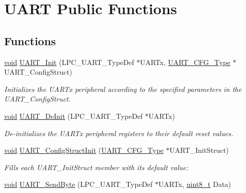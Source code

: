 \hypertarget{group___u_a_r_t___public___functions}{}\section{U\+A\+RT Public Functions}
\label{group___u_a_r_t___public___functions}
\subsection*{Functions}
\begin{DoxyCompactItemize}
\item 
\hyperlink{usb__devapi_8h_afabf60e7f57651d6d595a02c75f07cd0}{void} \hyperlink{group___u_a_r_t___public___functions_ga38648a309b0eb01e488f593f93fd9e02}{U\+A\+R\+T\+\_\+\+Init} (L\+P\+C\+\_\+\+U\+A\+R\+T\+\_\+\+Type\+Def $\ast$U\+A\+R\+Tx, \hyperlink{struct_u_a_r_t___c_f_g___type}{U\+A\+R\+T\+\_\+\+C\+F\+G\+\_\+\+Type} $\ast$U\+A\+R\+T\+\_\+\+Config\+Struct)
\begin{DoxyCompactList}\small\item\em Initializes the U\+A\+R\+Tx peripheral according to the specified parameters in the U\+A\+R\+T\+\_\+\+Config\+Struct. \end{DoxyCompactList}\item 
\hyperlink{usb__devapi_8h_afabf60e7f57651d6d595a02c75f07cd0}{void} \hyperlink{group___u_a_r_t___public___functions_ga3074f639a2a3de38e5d0129c8ba113b4}{U\+A\+R\+T\+\_\+\+De\+Init} (L\+P\+C\+\_\+\+U\+A\+R\+T\+\_\+\+Type\+Def $\ast$U\+A\+R\+Tx)
\begin{DoxyCompactList}\small\item\em De-\/initializes the U\+A\+R\+Tx peripheral registers to their default reset values. \end{DoxyCompactList}\item 
\hyperlink{usb__devapi_8h_afabf60e7f57651d6d595a02c75f07cd0}{void} \hyperlink{group___u_a_r_t___public___functions_gab27415db995bfdbcd9984073833053d9}{U\+A\+R\+T\+\_\+\+Config\+Struct\+Init} (\hyperlink{struct_u_a_r_t___c_f_g___type}{U\+A\+R\+T\+\_\+\+C\+F\+G\+\_\+\+Type} $\ast$U\+A\+R\+T\+\_\+\+Init\+Struct)
\begin{DoxyCompactList}\small\item\em Fills each U\+A\+R\+T\+\_\+\+Init\+Struct member with its default value\+: \end{DoxyCompactList}\item 
\hyperlink{usb__devapi_8h_afabf60e7f57651d6d595a02c75f07cd0}{void} \hyperlink{group___u_a_r_t___public___functions_gaed06c5f6548091cba78b88700b82ad62}{U\+A\+R\+T\+\_\+\+Send\+Byte} (L\+P\+C\+\_\+\+U\+A\+R\+T\+\_\+\+Type\+Def $\ast$U\+A\+R\+Tx, \hyperlink{_p_e___types_8h_aba7bc1797add20fe3efdf37ced1182c5}{uint8\+\_\+t} Data)

\end{DoxyCompactItemize}
